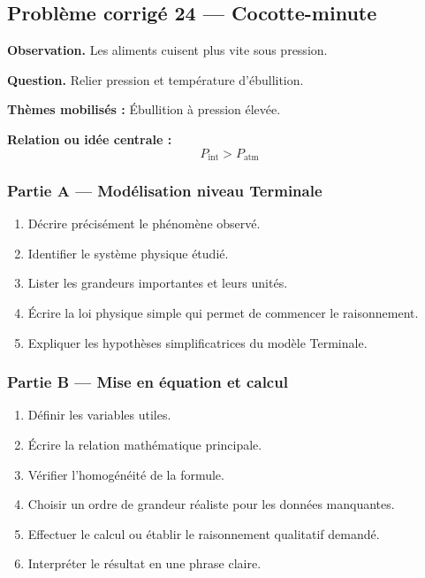 \documentclass[11pt,a4paper]{article}
\begin{document}
\subsection{Problème corrigé 24 — Cocotte-minute}

\begin{exercicebox}
\textbf{Observation.} Les aliments cuisent plus vite sous pression.

\medskip
\textbf{Question.} Relier pression et température d'ébullition.

\medskip
\textbf{Thèmes mobilisés :} Ébullition à pression élevée.

\medskip
\textbf{Relation ou idée centrale :}
\[
P_{\mathrm{int}}>P_{\mathrm{atm}}
\]
\end{exercicebox}

\subsubsection*{Partie A — Modélisation niveau Terminale}

\begin{enumerate}
  \item Décrire précisément le phénomène observé.
  \item Identifier le système physique étudié.
  \item Lister les grandeurs importantes et leurs unités.
  \item Écrire la loi physique simple qui permet de commencer le raisonnement.
  \item Expliquer les hypothèses simplificatrices du modèle Terminale.
\end{enumerate}

\subsubsection*{Partie B — Mise en équation et calcul}

\begin{enumerate}
  \item Définir les variables utiles.
  \item Écrire la relation mathématique principale.
  \item Vérifier l'homogénéité de la formule.
  \item Choisir un ordre de grandeur réaliste pour les données manquantes.
  \item Effectuer le calcul ou établir le raisonnement qualitatif demandé.
  \item Interpréter le résultat en une phrase claire.
\end{enumerate}
\end{document}
